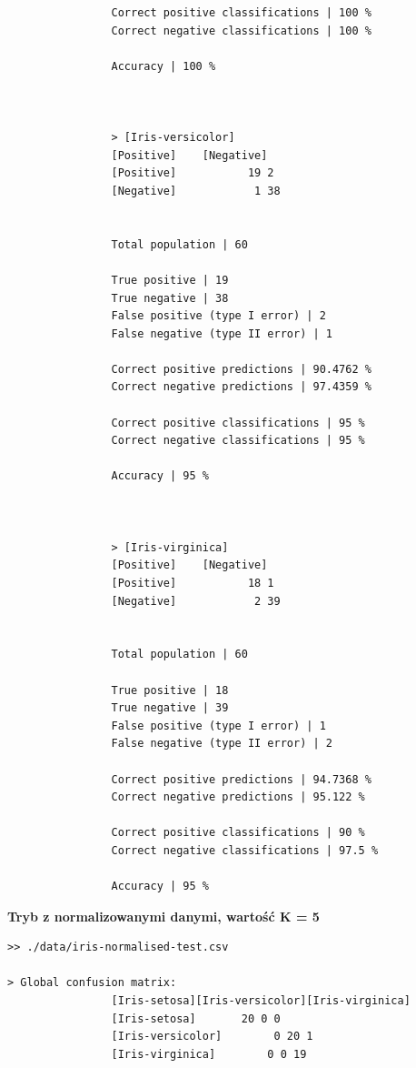 \documentclass{classrep}
\begin{document}
{{{\begin{lstlisting}
                Correct positive classifications | 100 %
                Correct negative classifications | 100 %

                Accuracy | 100 %



                > [Iris-versicolor]
                [Positive]    [Negative]
                [Positive]           19 2
                [Negative]            1 38


                Total population | 60

                True positive | 19
                True negative | 38
                False positive (type I error) | 2
                False negative (type II error) | 1

                Correct positive predictions | 90.4762 %
                Correct negative predictions | 97.4359 %

                Correct positive classifications | 95 %
                Correct negative classifications | 95 %

                Accuracy | 95 %



                > [Iris-virginica]
                [Positive]    [Negative]
                [Positive]           18 1
                [Negative]            2 39


                Total population | 60

                True positive | 18
                True negative | 39
                False positive (type I error) | 1
                False negative (type II error) | 2

                Correct positive predictions | 94.7368 %
                Correct negative predictions | 95.122 %

                Correct positive classifications | 90 %
                Correct negative classifications | 97.5 %

                Accuracy | 95 %

                \end{lstlisting}
                \textbf{Tryb z normalizowanymi danymi, wartość K = 5}
                \begin{lstlisting}
>> ./data/iris-normalised-test.csv

> Global confusion matrix:
                [Iris-setosa][Iris-versicolor][Iris-virginica]
                [Iris-setosa]       20 0 0
                [Iris-versicolor]        0 20 1
                [Iris-virginica]        0 0 19



\end{lstlisting}}}}
\end{document}
